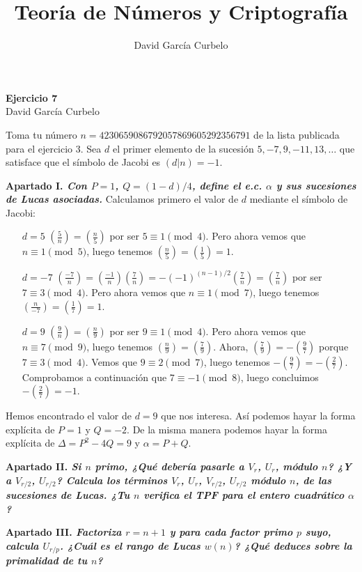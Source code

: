\documentclass[fleqn]{article}
\author{David García Curbelo}
\title{Teoría de Números y Criptografía}
\begin{document}
    \begin{center}
        \LARGE{\textbf{Ejercicio 7}} \\
        \Large{David García Curbelo} \\
    \end{center}

    \vspace{1cm}
    Toma tu número $n=4230659086792057869605292356791$ de la lista publicada para el ejercicio 3. Sea $d$ el 
    primer elemento de la sucesión $5, -7, 9, -11, 13, \dots$ que satisface que el símbolo de Jacobi es $(d|n) = -1$.


    \textbf{Apartado I. \textit{Con $P=1$, $Q = (1-d)/4$, define el e.c. $\alpha$ y sus sucesiones de Lucas asociadas.}}
    Calculamos primero el valor de $d$ mediante el símbolo de Jacobi:

    \begin{enumerate}
        \item[$d = 5$] $\left(\frac{5}{n}\right) = \left(\frac{n}{5}\right)$ por ser $5 \equiv 1 \pmod{4}$. Pero ahora
                        vemos que $n \equiv 1 \pmod{5}$, luego tenemos $\left(\frac{n}{5}\right) = \left(\frac{1}{5}\right) = 1$. 
        \item[$d = -7$] $\left(\frac{-7}{n}\right) = \left(\frac{-1}{n}\right) \left(\frac{7}{n}\right) = -(-1)^{(n-1)/2}\left(\frac{7}{n}\right)
                        = \left(\frac{7}{n}\right)$ por ser $7 \equiv 3 \pmod{4}$. Pero ahora vemos que $n \equiv 1 \pmod{7}$, luego tenemos 
                        $\left(\frac{n}{-7}\right) = \left(\frac{1}{7}\right) = 1$.
        \item[$d = 9$] $\left(\frac{9}{n}\right) = \left(\frac{n}{9}\right)$ por ser $9 \equiv 1 \pmod{4}$. Pero ahora
                        vemos que $n \equiv 7 \pmod{9}$, luego tenemos $\left(\frac{n}{9}\right) = \left(\frac{7}{9}\right)$. Ahora,
                        $\left(\frac{7}{9}\right) = -\left(\frac{9}{7}\right)$ porque $7 \equiv 3 \pmod{4}$. Vemos que
                        $9 \equiv 2 \pmod{7}$, luego tenemos $-\left(\frac{9}{7}\right) = -\left(\frac{2}{7}\right)$. Comprobamos a 
                        continuación que $7 \equiv -1 \pmod{8}$, luego concluimos $-\left(\frac{2}{7}\right) = -1$.
    \end{enumerate}

    Hemos encontrado el valor de $d = 9$ que nos interesa. Así podemos hayar la forma explícita de $P = 1$ y $Q = -2$.
    De la misma manera podemos hayar la forma explícita de $\Delta = P^2 - 4Q = 9$ y $\alpha = P + Q$.

    \newpage
    \textbf{Apartado II. \textit{Si $n$ primo, ¿Qué debería pasarle a $V_r$, $U_r$, módulo $n$? ¿Y a $V_{r/2}$, $U_{r/2}$?
            Calcula los términos $V_r$, $U_r$, $V_{r/2}$, $U_{r/2}$ módulo $n$, de las sucesiones de Lucas.
            ¿Tu $n$ verifica el TPF para el entero cuadrático $\alpha$?}}

    
    \newpage
    \textbf{Apartado III. \textit{Factoriza $r = n+1$ y para cada factor primo $p$ suyo, calcula $U_{r/p}$.
            ¿Cuál es el rango de Lucas $w(n)$? ¿Qué deduces sobre la primalidad de tu $n$?}}
            
\end{document}
